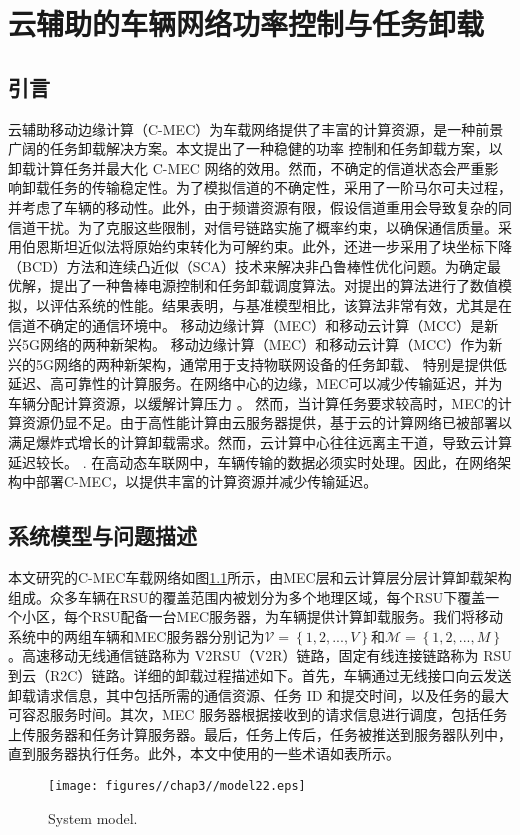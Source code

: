 \chapter{云辅助的车辆网络功率控制与任务卸载}
\label{chap:table}

\section{引言}\label{section3-1}
\label{chap:introduction}
云辅助移动边缘计算（C-MEC）为车载网络提供了丰富的计算资源，是一种前景广阔的任务卸载解决方案。本文提出了一种稳健的功率
控制和任务卸载方案，以卸载计算任务并最大化 C-MEC 网络的效用。然而，不确定的信道状态会严重影响卸载任务的传输稳定性。为了模拟信道的不确定性，采用了一阶马尔可夫过程，并考虑了车辆的移动性。此外，由于频谱资源有限，假设信道重用会导致复杂的同信道干扰。为了克服这些限制，对信号链路实施了概率约束，以确保通信质量。采用伯恩斯坦近似法将原始约束转化为可解约束。此外，还进一步采用了块坐标下降（BCD）方法和连续凸近似（SCA）技术来解决非凸鲁棒性优化问题。为确定最优解，提出了一种鲁棒电源控制和任务卸载调度算法。对提出的算法进行了数值模拟，以评估系统的性能。结果表明，与基准模型相比，该算法非常有效，尤其是在信道不确定的通信环境中。
移动边缘计算（MEC）和移动云计算（MCC）是新兴5G网络的两种新架构。
移动边缘计算（MEC）和移动云计算（MCC）作为新兴的5G网络的两种新架构，通常用于支持物联网设备的任务卸载、
特别是提供低延迟、高可靠性的计算服务。在网络中心的边缘，MEC可以减少传输延迟，并为车辆分配计算资源，以缓解计算压力
\cite{CCO}。
然而，当计算任务要求较高时，MEC的计算资源仍显不足。由于高性能计算由云服务器提供，基于云的计算网络已被部署以满足爆炸式增长的计算卸载需求。然而，云计算中心往往远离主干道，导致云计算延迟较长。
\cite{Qian2023}.
在高动态车联网中，车辆传输的数据必须实时处理。因此，在网络架构中部署C-MEC，以提供丰富的计算资源并减少传输延迟。
\section{系统模型与问题描述}\label{section3-2}
本文研究的C-MEC车载网络如图\ref{F1}所示，由MEC层和云计算层分层计算卸载架构组成。众多车辆在RSU的覆盖范围内被划分为多个地理区域，每个RSU下覆盖一个小区，每个RSU配备一台MEC服务器，为车辆提供计算卸载服务。我们将移动系统中的两组车辆和MEC服务器分别记为$\mathcal{V}=\left\{1,2,..., V\right\}$和$\mathcal{M}=\left\{1,2,..., M\right\}$。高速移动无线通信链路称为 V2RSU（V2R）链路，固定有线连接链路称为 RSU 到云（R2C）链路。详细的卸载过程描述如下。首先，车辆通过无线接口向云发送卸载请求信息，其中包括所需的通信资源、任务 ID 和提交时间，以及任务的最大可容忍服务时间。其次，MEC 服务器根据接收到的请求信息进行调度，包括任务上传服务器和任务计算服务器。最后，任务上传后，任务被推送到服务器队列中，直到服务器执行任务。此外，本文中使用的一些术语如表所示。
\begin{figure}[H]
\centering
\texttt{[image: figures//chap3//model22.eps]}
\caption{System model.}
\label{F1}
\end{figure}

